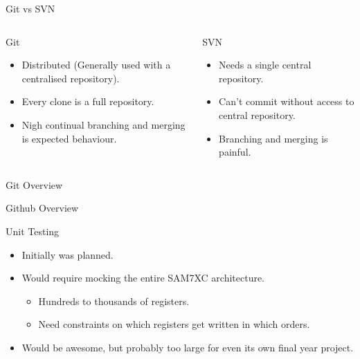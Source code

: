 \documentclass[xcolor=dvipsnames]{beamer}
\begin{document}
    \begin{frame}{Git vs SVN}
      \begin{columns}
          \begin{block}{Git}
            \begin{itemize}
              \item Distributed (Generally used with a centralised repository).
              \item Every clone is a full repository.
              \item Nigh continual branching and merging is expected behaviour.
            \end{itemize}
          \end{block}

          \begin{block}{SVN}
            \begin{itemize}
              \item Needs a single central repository.
              \item Can't commit without access to central repository.
              \item Branching and merging is painful.
            \end{itemize}
          \end{block}
      \end{columns}
    \end{frame}

    \begin{frame}{Git Overview}
    \end{frame}

    \begin{frame}{Github Overview}
    \end{frame}

    \begin{frame}{Unit Testing}
      \begin{itemize}
        \item Initially was planned.
        \item Would require mocking the entire SAM7XC architecture.
        \begin{itemize}
          \item Hundreds to thousands of registers.
          \item Need constraints on which registers get written in which orders.
        \end{itemize}
        \item Would be awesome, but probably too large for even its own final year project.
      \end{itemize}
    \end{frame}
\end{document}
